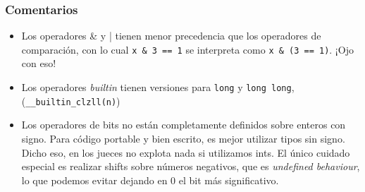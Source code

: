\subsubsection*{Comentarios}
\begin{itemize}
	\item Los operadores \& y | tienen menor precedencia que los operadores de comparación, con lo cual \lstinline{x & 3 == 1} se interpreta como \lstinline{x & (3 == 1)}. ¡Ojo con eso!
	\item Los operadores \textit{builtin} tienen versiones para \lstinline{long} y \lstinline{long long}, (\lstinline{__builtin_clzll(n)})
	\item Los operadores de bits no están completamente definidos sobre enteros con signo. Para código portable y bien escrito, es mejor utilizar tipos sin signo. Dicho eso, en los jueces no explota nada si utilizamos ints. El único cuidado especial es realizar shifts sobre números negativos, que es \textit{undefined behaviour}, lo que podemos evitar dejando en $0$ el bit más significativo.
\end{itemize}
